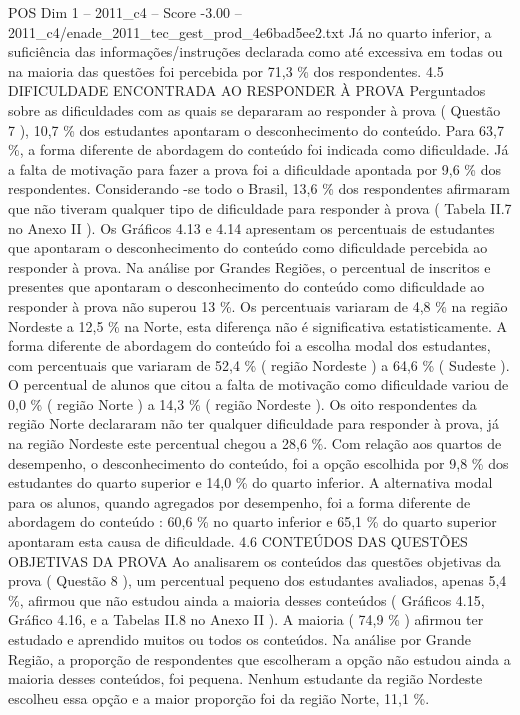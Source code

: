 \begin{textsample}{POS Dim 1 – 2011\_c4 – Score -3.00 – 2011\_c4/enade\_2011\_tec\_gest\_prod\_4e6bad5ee2.txt}
Já no quarto inferior, a suficiência das informações/instruções declarada como até excessiva em todas ou na maioria das questões foi percebida por 71,3 \% dos respondentes. 4.5 DIFICULDADE ENCONTRADA AO RESPONDER À PROVA Perguntados sobre as dificuldades com as quais se depararam ao responder à prova ( Questão 7 ), 10,7 \% dos estudantes apontaram o desconhecimento do conteúdo.
Para 63,7 \%, a forma diferente de abordagem do conteúdo foi indicada como dificuldade.
Já a falta de motivação para fazer a prova foi a dificuldade apontada por 9,6 \% dos respondentes.
Considerando -se todo o Brasil, 13,6 \% dos respondentes afirmaram que não tiveram qualquer tipo de dificuldade para responder à prova ( Tabela II.7 no Anexo II ).
Os Gráficos 4.13 e 4.14 apresentam os percentuais de estudantes que apontaram o desconhecimento do conteúdo como dificuldade percebida ao responder à prova.
Na análise por Grandes Regiões, o percentual de inscritos e presentes que apontaram o desconhecimento do conteúdo como dificuldade ao responder à prova não superou 13 \%.
Os percentuais variaram de 4,8 \% na região Nordeste a 12,5 \% na Norte, esta diferença não é significativa estatisticamente.
A forma diferente de abordagem do conteúdo foi a escolha modal dos estudantes, com percentuais que variaram de 52,4 \% ( região Nordeste ) a 64,6 \% ( Sudeste ).
O percentual de alunos que citou a falta de motivação como dificuldade variou de 0,0 \% ( região Norte ) a 14,3 \% ( região Nordeste ).
Os oito respondentes da região Norte declararam não ter qualquer dificuldade para responder à prova, já na região Nordeste este percentual chegou a 28,6 \%.
Com relação aos quartos de desempenho, o desconhecimento do conteúdo, foi a opção escolhida por 9,8 \% dos estudantes do quarto superior e 14,0 \% do quarto inferior.
A alternativa modal para os alunos, quando agregados por desempenho, foi a forma diferente de abordagem do conteúdo : 60,6 \% no quarto inferior e 65,1 \% do quarto superior apontaram esta causa de dificuldade. 4.6 CONTEÚDOS DAS QUESTÕES OBJETIVAS DA PROVA Ao analisarem os conteúdos das questões objetivas da prova ( Questão 8 ), um percentual pequeno dos estudantes avaliados, apenas 5,4 \%, afirmou que não estudou ainda a maioria desses conteúdos ( Gráficos 4.15, Gráfico 4.16, e a Tabelas II.8 no Anexo II ).
A maioria ( 74,9 \% ) afirmou ter estudado e aprendido muitos ou todos os conteúdos.
Na análise por Grande Região, a proporção de respondentes que escolheram a opção não estudou ainda a maioria desses conteúdos, foi pequena.
Nenhum estudante da região Nordeste escolheu essa opção e a maior proporção foi da região Norte, 11,1 \%.

\end{textsample}
